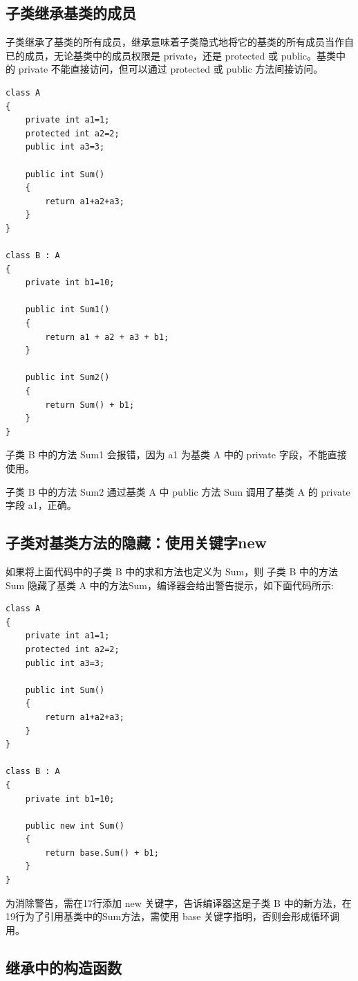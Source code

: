 \subsection{子类继承基类的成员}

子类继承了基类的所有成员，继承意味着子类隐式地将它的基类的所有成员当作自已的成员，无论基类中的成员权限是 private，还是 protected 或 public。基类中的 private 不能直接访问，但可以通过 protected 或 public 方法间接访问。

\begin{lstlisting}
class A
{
	private int a1=1;
	protected int a2=2;
	public int a3=3;
		
	public int Sum()
	{
		return a1+a2+a3;
	}
}
	
class B : A
{
	private int b1=10;
	
	public int Sum1()
	{
		return a1 + a2 + a3 + b1; 
	}
	
	public int Sum2()
	{
		return Sum() + b1; 
	}
}
\end{lstlisting}

子类 B 中的方法 Sum1 会报错，因为 a1 为基类 A 中的 private 字段，不能直接使用。

子类 B 中的方法 Sum2 通过基类 A 中 public 方法 Sum 调用了基类 A 的 private 字段 a1，正确。


\subsection{子类对基类方法的隐藏：使用关键字new}

如果将上面代码中的子类 B 中的求和方法也定义为 Sum，则 子类 B 中的方法 Sum 隐藏了基类 A 中的方法Sum，编译器会给出警告提示，如下面代码所示:

\begin{lstlisting}
class A
{
	private int a1=1;
	protected int a2=2;
	public int a3=3;
	
	public int Sum()
	{
		return a1+a2+a3;
	}
}

class B : A
{
	private int b1=10;	
	
	public new int Sum()
	{
		return base.Sum() + b1; 
	}
}
\end{lstlisting}

为消除警告，需在17行添加 new 关键字，告诉编译器这是子类 B 中的新方法，在19行为了引用基类中的Sum方法，需使用 base 关键字指明，否则会形成循环调用。


\subsection{继承中的构造函数}

